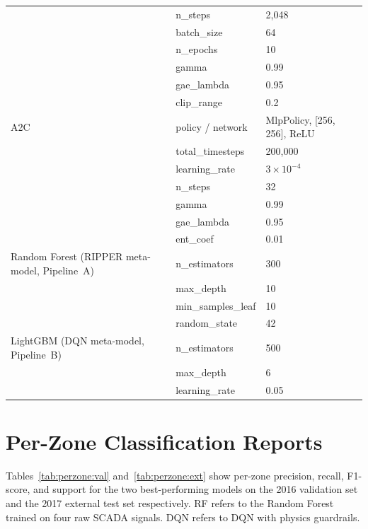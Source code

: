 \begin{longtable}{p{5.8cm} p{5.0cm} p{3.0cm}}
 & n\_steps & 2,048 \\
 & batch\_size & 64 \\
 & n\_epochs & 10 \\
 & gamma & 0.99 \\
 & gae\_lambda & 0.95 \\
 & clip\_range & 0.2 \\
\midrule
A2C & policy / network & MlpPolicy, [256, 256], ReLU \\
 & total\_timesteps & 200,000 \\
 & learning\_rate & $3 \times 10^{-4}$ \\
 & n\_steps & 32 \\
 & gamma & 0.99 \\
 & gae\_lambda & 0.95 \\
 & ent\_coef & 0.01 \\
\midrule
Random Forest (RIPPER meta-model, Pipeline~A) & n\_estimators & 300 \\
 & max\_depth & 10 \\
 & min\_samples\_leaf & 10 \\
 & random\_state & 42 \\
\midrule
LightGBM (DQN meta-model, Pipeline~B) & n\_estimators & 500 \\
 & max\_depth & 6 \\
 & learning\_rate & 0.05 \\
\end{longtable}

\chapter{Per-Zone Classification Reports}
\label{app:perzone}

Tables~\ref{tab:perzone:val} and~\ref{tab:perzone:ext} show per-zone precision, recall,
F1-score, and support for the two best-performing models on the 2016 validation set and
the 2017 external test set respectively. RF refers to the Random Forest trained on four
raw SCADA signals. DQN refers to DQN with physics guardrails.

